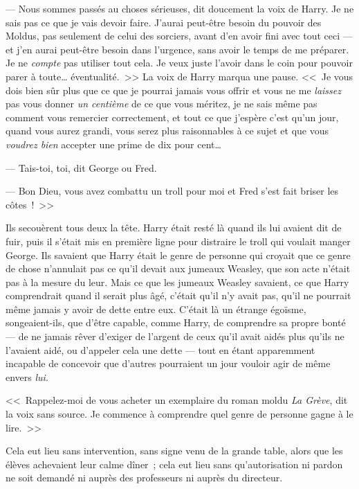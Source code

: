 --- Nous sommes passés au choses sérieuses, dit doucement la voix de Harry. Je ne sais pas ce que je vais devoir faire. J'aurai peut-être besoin du pouvoir des Moldus, pas seulement de celui des sorciers, avant d'en avoir fini avec tout ceci — et j'en aurai peut-être besoin dans l'urgence, sans avoir le temps de me préparer. Je ne \emph{compte} pas utiliser tout cela. Je veux juste l'avoir dans le coin pour pouvoir parer à toute… éventualité.~>> La voix de Harry marqua une pause. <<~Je vous dois bien sûr plus que ce que je pourrai jamais vous offrir et vous ne me \emph{laissez} pas vous donner \emph{un centième} de ce que vous méritez, je ne sais même pas comment vous remercier correctement, et tout ce que j'espère c'est qu'un jour, quand vous aurez grandi, vous serez plus raisonnables à ce sujet et que vous \emph{voudrez bien} accepter une prime de dix pour cent…

--- Tais-toi, toi, dit George ou Fred.

--- Bon Dieu, vous avez combattu un troll pour moi et Fred s'est fait briser les côtes~!~>>

Ils secouèrent tous deux la tête. Harry était resté là quand ils lui avaient dit de fuir, puis il s'était mis en première ligne pour distraire le troll qui voulait manger George. Ils savaient que Harry était le genre de personne qui croyait que ce genre de chose n'annulait pas ce qu'il devait aux jumeaux Weasley, que son acte n'était pas à la mesure du leur. Mais ce que les jumeaux Weasley savaient, ce que Harry comprendrait quand il serait plus âgé, c'était qu'il n'y avait pas, qu'il ne pourrait même jamais y avoir de dette entre eux. C'était là un étrange égoïsme, songeaient-ils, que d'être capable, comme Harry, de comprendre sa propre bonté — de ne jamais rêver d'exiger de l'argent de ceux qu'il avait aidés plus qu'ils ne l'avaient aidé, ou d'appeler cela une dette — tout en étant apparemment incapable de concevoir que d'autres pourraient un jour vouloir agir de même envers \emph{lui}.

<<~Rappelez-moi de vous acheter un exemplaire du roman moldu \emph{La Grève}, dit la voix sans source. Je commence à comprendre quel genre de personne gagne à le lire.~>>


Cela eut lieu sans intervention, sans signe venu de la grande table, alors que les élèves achevaient leur calme dîner~; cela eut lieu sans qu'autorisation ni pardon ne soit demandé ni auprès des professeurs ni auprès du directeur.

